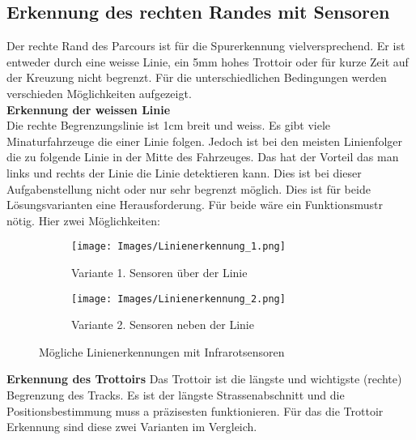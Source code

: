 
\subsection{Erkennung des rechten Randes mit Sensoren}
Der rechte Rand des Parcours ist für die Spurerkennung vielversprechend. Er ist entweder durch eine weisse Linie, ein 5mm hohes Trottoir oder für kurze Zeit auf der Kreuzung nicht begrenzt.
Für die unterschiedlichen Bedingungen werden verschieden Möglichkeiten aufgezeigt.\\

\textbf {Erkennung der weissen Linie} \\
Die rechte Begrenzungslinie ist 1cm breit und weiss. Es gibt viele Minaturfahrzeuge die einer Linie folgen. Jedoch ist bei den meisten Linienfolger die zu folgende Linie in der Mitte des Fahrzeuges. Das hat der Vorteil das man links und rechts der Linie die Linie detektieren kann. Dies ist bei dieser Aufgabenstellung nicht oder nur sehr begrenzt möglich. Dies ist für beide Lösungsvarianten eine Herausforderung. Für beide wäre ein Funktionsmustr nötig.
Hier zwei Möglichkeiten:\\

\begin{figure} [hbp]
	\centering
	\begin{subfigure}[b]{0.4\textwidth}
		\texttt{[image: Images/Linienerkennung\_1.png]}
		\caption{Variante 1. Sensoren über der Linie}
	\end{subfigure}
	\hfill
	\begin{subfigure}[b]{0.42\textwidth}
		\texttt{[image: Images/Linienerkennung\_2.png]}
		\caption{Variante 2. Sensoren neben der Linie}
\end{subfigure}
	\caption{Mögliche Linienerkennungen mit Infrarotsensoren}\label{fig:animals}
\end{figure}

\textbf {Erkennung des Trottoirs}
Das Trottoir ist die längste und wichtigste (rechte) Begrenzung des Tracks. Es ist der längste Strassenabschnitt und die Positionsbestimmung muss a präzisesten funktionieren. Für das die Trottoir Erkennung sind diese zwei Varianten im Vergleich.\\
 
